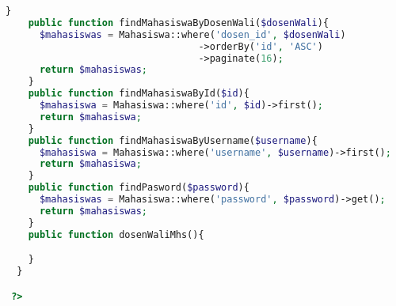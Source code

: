 \begin{lstlisting}[language=php, caption=MahasiswaRepository.php]
    }
    public function findMahasiswaByDosenWali($dosenWali){
      $mahasiswas = Mahasiswa::where('dosen_id', $dosenWali)
                                  ->orderBy('id', 'ASC')
                                  ->paginate(16);
      return $mahasiswas;
    }
    public function findMahasiswaById($id){
      $mahasiswa = Mahasiswa::where('id', $id)->first();
      return $mahasiswa;
    }
    public function findMahasiswaByUsername($username){
      $mahasiswa = Mahasiswa::where('username', $username)->first();
      return $mahasiswa;
    }
    public function findPasword($password){
      $mahasiswas = Mahasiswa::where('password', $password)->get();
      return $mahasiswas;
    }
    public function dosenWaliMhs(){

    }
  }

 ?>

\end{lstlisting}

